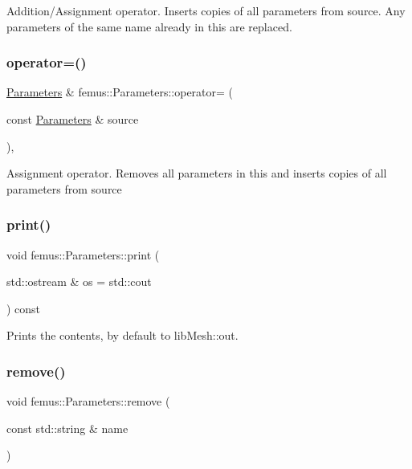Addition/\+Assignment operator. Inserts copies of all parameters from {\ttfamily source}. Any parameters of the same name already in {\ttfamily this} are replaced. \mbox{\label{classfemus_1_1_parameters_a4c877bb7d62bd1ca6a7e42b1968718d3}} 
\subsubsection{\texorpdfstring{operator=()}{operator=()}}
{\footnotesize\ttfamily \mbox{\hyperlink{classfemus_1_1_parameters}{Parameters}} \& femus\+::\+Parameters\+::operator= (\begin{DoxyParamCaption}\item[{const \mbox{\hyperlink{classfemus_1_1_parameters}{Parameters}} \&}]{source }\end{DoxyParamCaption})\hspace{0.3cm}{\ttfamily [inline]}, {\ttfamily [virtual]}}

Assignment operator. Removes all parameters in {\ttfamily this} and inserts copies of all parameters from {\ttfamily source} \mbox{\label{classfemus_1_1_parameters_ad588c9af94c63cc1198bed69ec0d06f9}} 
\subsubsection{\texorpdfstring{print()}{print()}}
{\footnotesize\ttfamily void femus\+::\+Parameters\+::print (\begin{DoxyParamCaption}\item[{std\+::ostream \&}]{os = {\ttfamily std\+:\+:cout} }\end{DoxyParamCaption}) const\hspace{0.3cm}{\ttfamily [inline]}}

Prints the contents, by default to lib\+Mesh\+::out. \mbox{\label{classfemus_1_1_parameters_a7f76841c9826157a5837e680cb990f94}} 
\subsubsection{\texorpdfstring{remove()}{remove()}}
{\footnotesize\ttfamily void femus\+::\+Parameters\+::remove (\begin{DoxyParamCaption}\item[{const std\+::string \&}]{name }\end{DoxyParamCaption})\hspace{0.3cm}{\ttfamily [inline]}}

